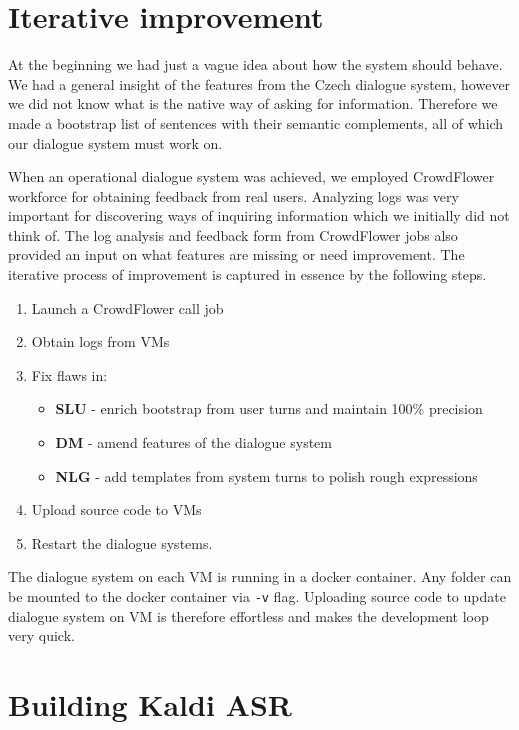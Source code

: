 \section{Iterative improvement}

At the beginning we had just a vague idea about how the system should behave.
We had a general insight of the features from the Czech dialogue system, however we did not know what is the native way of asking for information. %
Therefore we made a bootstrap list of sentences with their semantic complements, all of which our dialogue system must work on.

When an operational dialogue system was achieved, we employed CrowdFlower workforce for obtaining feedback from real users.
Analyzing logs was very important for discovering ways of inquiring information which we initially did not think of.
The log analysis and feedback form from CrowdFlower jobs also provided an input on what features are missing or need improvement.
The iterative process of improvement is captured in essence by the following steps. %

\begin{enumerate}
	\item Launch a CrowdFlower call job
	\item Obtain logs from VMs
	\item Fix flaws in:
	\begin{itemize}
		\item \textbf{SLU} - enrich bootstrap from user turns and maintain 100\% precision
		\item \textbf{DM} - amend features of the dialogue system
		\item \textbf{NLG} - add templates from system turns to polish rough expressions
	\end{itemize}
	\item Upload source code to VMs
	\item Restart the dialogue systems.
\end{enumerate}


The dialogue system on each VM is running in a docker container.
Any folder can be mounted to the docker container via \texttt{-v} flag.
Uploading source code to update dialogue system on VM is therefore effortless and makes the development loop very quick.


\section{Building Kaldi ASR}

